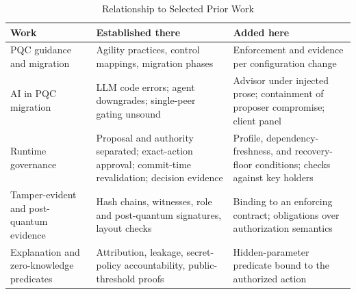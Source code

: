 \begin{table}[t]
\caption{Relationship to Selected Prior Work}
\label{tab:related}
\centering
\footnotesize
\setlength{\tabcolsep}{3pt}
\begin{tabular}{>{\raggedright\arraybackslash}p{2.55cm}>{\raggedright\arraybackslash}p{2.6cm}>{\raggedright\arraybackslash}p{2.75cm}}
\toprule
Work & Established there & Added here \\
\midrule
PQC guidance and migration~\cite{cswp39,cswp48,naether,meta} & Agility practices, control mappings, migration phases & Enforcement and evidence per configuration change \\
\addlinespace[2pt]
AI in PQC migration~\cite{kimpqc,han} & LLM code errors; agent downgrades; single-peer gating unsound & Advisor under injected prose; containment of proposer compromise; client panel \\
\addlinespace[2pt]
Runtime governance~\cite{aegis,mazz2,beshane,aidguard,airep} & Proposal and authority separated; exact-action approval; commit-time revalidation; decision evidence & Profile, dependency-freshness, and recovery-floor conditions; checks against key holders \\
\addlinespace[2pt]
Tamper-evident and post-quantum evidence~\cite{schneier,crosby,ct,intoto,kao,asqav} & Hash chains, witnesses, role and post-quantum signatures, layout checks & Binding to an enforcing contract; obligations over authorization semantics \\
\addlinespace[2pt]
Explanation and zero-knowledge predicates~\cite{shap,lime,shokri,kroll,gopalakrishna} & Attribution, leakage, secret-policy accountability, public-threshold proofs & Hidden-parameter predicate bound to the authorized action \\
\bottomrule
\end{tabular}
\end{table}
